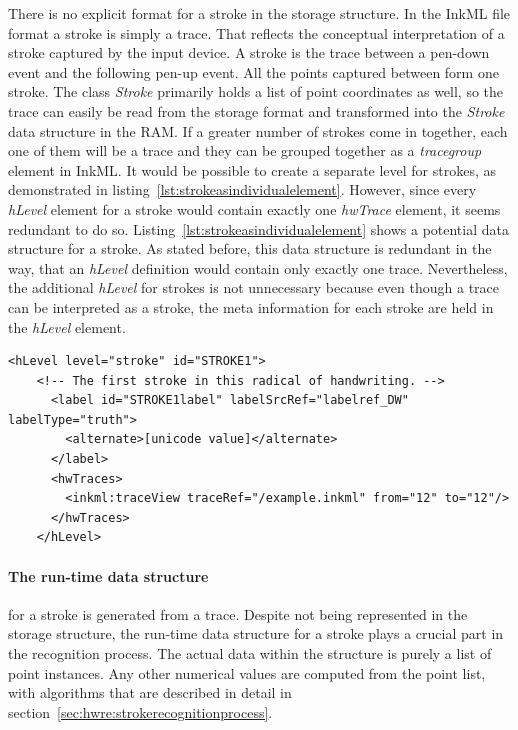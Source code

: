 There is no explicit format for a stroke in the storage structure.
In the InkML file format a stroke is simply a trace. That reflects the
conceptual interpretation of a stroke captured by the input device.
A stroke is the trace between a pen-down event and the following pen-up
event. All the points captured between form one stroke.
The class \emph{Stroke} primarily holds a list of point coordinates
as well, so the trace can easily be read from the storage format and 
transformed into the \emph{Stroke} data structure in the RAM.
If a greater number of strokes come in together, each one of them will be a trace
and they can be grouped together as a \emph{tracegroup} element in InkML.
It would be possible to create a separate level for strokes, as demonstrated
in listing~\ref{lst:strokeasindividualelement}. However, since every 
\emph{hLevel} element for a stroke would contain exactly one \emph{hwTrace} 
element, it seems redundant to do so.
Listing~\ref{lst:strokeasindividualelement} shows a potential data structure
for a stroke. As stated before, this data structure is redundant in the way, 
that an \emph{hLevel} definition would contain only exactly one trace.
Nevertheless, the additional \emph{hLevel} for strokes is not unnecessary
because even though a trace can be interpreted as a stroke,
the meta information for each stroke are held in the \emph{hLevel} element.

\begin{xmlcode}
  \begin{lstlisting}[emph={hLevel,hwTraces,label,alternative},
                     emphstyle=\color{blue}\textbf,
                     emph={[2]level,labelSrcRef,labelType,traceRef,from,to},
                     emphstyle={[2]\color{red}},
                     caption={An example of a stroke 
                              representation in UPX},
                     label=lst:strokeasindividualelement]
    <hLevel level="stroke" id="STROKE1">
    <!-- The first stroke in this radical of handwriting. -->
      <label id="STROKE1label" labelSrcRef="labelref_DW" labelType="truth">
        <alternate>[unicode value]</alternate>
      </label>
      <hwTraces>
        <inkml:traceView traceRef="/example.inkml" from="12" to="12"/>
      </hwTraces>
    </hLevel>
  \end{lstlisting}
\end{xmlcode}

\paragraph{The run-time data structure} for a stroke is generated from a trace.
Despite not being represented in the storage structure, the run-time data
structure for a stroke plays a crucial part in the recognition process.
The actual data within the structure is purely a list of point instances. 
Any other numerical values are computed from the point list, with algorithms
that are described in detail in 
section~\ref{sec:hwre:strokerecognitionprocess}.

